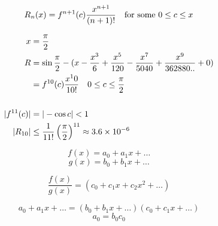 \documentclass[svgnames]{article}   	%
\begin{document}
\begin{tcolorbox}[colback = blue!5!white, colframe = blue!50!black, title
  = Remainder Theorem]
 \[ 
  R_n(x) = f^{n+1} (c) \frac{x^{n+1}}{(n+1)!} \hspace{10px} \text{for some $0
  \leq c \leq x$}
\]
\end{tcolorbox}

\begin{tcolorbox}	
  
  \begin{align*}
    x &= \frac{\pi}{2} \\ 
    R &= \sin \frac{\pi}{2} - (x - \frac{x^3}{6} + \frac{x^5}{120}
    - \frac{x^7}{5040} + \frac{x^9}{362880..} + 0 ) \\
      &= f^{10}(c)\frac{x^10}{10!} \hspace{10px} 0 \leq c \leq \frac{\pi}{2}
      \\\\
    |f^{11} (c) | &= | -\cos c| < 1 \\
    |R_{10}| &\leq \frac{1}{11!} \left(\frac{\pi}{2}\right)^{11} \approx 3.6
    \times 10^{-6}
  \end{align*}

\end{tcolorbox}	

\vspace{5px} \[
f(x) = a_0 + a_1x + \dots 
\] \vspace{5px}
\[
g(x) = b_0 + b_1x + \dots
\]

\[
\frac{f(x)}{g(x)} = (c_0 + c_1x +c_2x^2 + \dots)
\]

\[
a_0 + a_1x + \dots = (b_0 + b_1x + \dots)(c_0 + c_1x + \dots) 
\]
\[
a_0 = b_0c_0
\]
\end{document}
